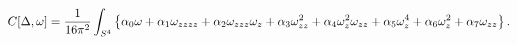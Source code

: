 \begin{equation}
C[\Delta,\omega]={1\over 16\pi^2}\int_{S^4}\left\{
\alpha_0\omega+\alpha_1\omega_{zzzz}+\alpha_2\omega_{zzz}\omega_{z}+
\alpha_3\omega_{zz}^2+\alpha_4\omega_{z}^2\omega_{zz}+\alpha_5\omega_{z}^4+
\alpha_6\omega_{z}^2+\alpha_7\omega_{zz}\right\}.
\label{fullc}
\end{equation}

